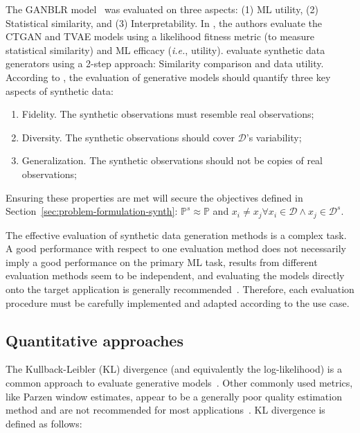 The GANBLR model~\cite{zhang2021ganblr} was evaluated on three aspects: (1) ML
utility, (2) Statistical similarity, and (3) Interpretability. In
\citet{xu2019modeling}, the authors evaluate the CTGAN and TVAE models using a
likelihood fitness metric (to measure statistical similarity) and ML efficacy
(\textit{i.e.}, utility). \citet{hittmeir2019utility} evaluate synthetic data
generators using a 2-step approach: Similarity comparison and data utility.
According to \citet{alaa2022faithful}, the evaluation of generative models
should quantify three key aspects of synthetic data:

\begin{enumerate}

    \item Fidelity. The synthetic observations must resemble real
        observations; 

    \item Diversity. The synthetic observations should cover $\mathcal{D}$'s
        variability;

    \item Generalization. The synthetic observations should not be copies of
        real observations;

\end{enumerate}

Ensuring these properties are met will secure the objectives defined in
Section~\ref{sec:problem-formulation-synth}: $\mathbb{P}^s \approx
\mathbb{P}$ and $x_i \neq x_j \forall x_i \in \mathcal{D} \wedge x_j \in
\mathcal{D}^s$.

The effective evaluation of synthetic data generation methods is a complex
task. A good performance with respect to one evaluation method does not
necessarily imply a good performance on the primary ML task, results from
different evaluation methods seem to be independent, and evaluating the models
directly onto the target application is generally
recommended~\cite{theis2016note}. Therefore, each evaluation procedure must be
carefully implemented and adapted according to the use case.

\subsection{Quantitative approaches}

The Kullback-Leibler (KL) divergence (and equivalently the log-likelihood) is a
common approach to evaluate generative models~\cite{theis2016note}. Other
commonly used metrics, like Parzen window estimates, appear to be a generally
poor quality estimation method and are not recommended for most
applications~\cite{theis2016note}. KL divergence is defined as follows:

